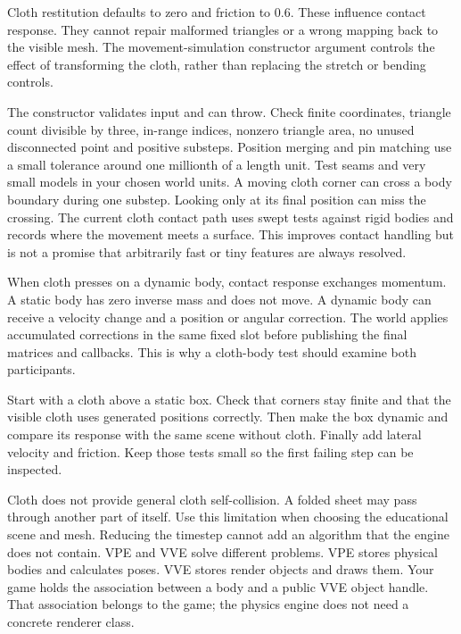 \documentclass[11pt,a4paper]{article}
\begin{document}
Cloth restitution defaults to zero and friction to 0.6. These influence contact response. They cannot repair malformed triangles or a wrong mapping back to the visible mesh. The movement-simulation constructor argument controls the effect of transforming the cloth, rather than replacing the stretch or bending controls.

The constructor validates input and can throw. Check finite coordinates, triangle count divisible by three, in-range indices, nonzero triangle area, no unused disconnected point and positive substeps. Position merging and pin matching use a small tolerance around one millionth of a length unit. Test seams and very small models in your chosen world units.
A moving cloth corner can cross a body boundary during one substep. Looking only at its final position can miss the crossing. The current cloth contact path uses swept tests against rigid bodies and records where the movement meets a surface. This improves contact handling but is not a promise that arbitrarily fast or tiny features are always resolved.

When cloth presses on a dynamic body, contact response exchanges momentum. A static body has zero inverse mass and does not move. A dynamic body can receive a velocity change and a position or angular correction. The world applies accumulated corrections in the same fixed slot before publishing the final matrices and callbacks. This is why a cloth-body test should examine both participants.

Start with a cloth above a static box. Check that corners stay finite and that the visible cloth uses generated positions correctly. Then make the box dynamic and compare its response with the same scene without cloth. Finally add lateral velocity and friction. Keep those tests small so the first failing step can be inspected.

Cloth does not provide general cloth self-collision. A folded sheet may pass through another part of itself. Use this limitation when choosing the educational scene and mesh. Reducing the timestep cannot add an algorithm that the engine does not contain.
VPE and VVE solve different problems. VPE stores physical bodies and calculates poses. VVE stores render objects and draws them. Your game holds the association between a body and a public VVE object handle. That association belongs to the game; the physics engine does not need a concrete renderer class.
\end{document}
